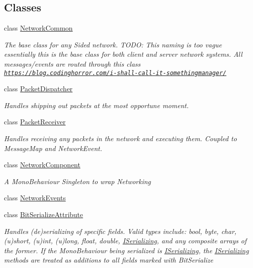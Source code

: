 \subsection*{Classes}
\begin{DoxyCompactItemize}
\item 
class \hyperlink{class_skyrates_1_1_common_1_1_network_1_1_network_common}{Network\-Common}
\begin{DoxyCompactList}\small\item\em The base class for any Sided network. T\-O\-D\-O\-: This naming is too vague essentially this is the base class for both client and server network systems. All messages/events are routed through this class \href{https://blog.codinghorror.com/i-shall-call-it-somethingmanager/}{\tt https\-://blog.\-codinghorror.\-com/i-\/shall-\/call-\/it-\/somethingmanager/} \end{DoxyCompactList}\item 
class \hyperlink{class_skyrates_1_1_common_1_1_network_1_1_packet_dispatcher}{Packet\-Dispatcher}
\begin{DoxyCompactList}\small\item\em Handles shipping out packets at the most opportune moment. \end{DoxyCompactList}\item 
class \hyperlink{class_skyrates_1_1_common_1_1_network_1_1_packet_receiver}{Packet\-Receiver}
\begin{DoxyCompactList}\small\item\em Handles receiving any packets in the network and executing them. Coupled to Message\-Map and Network\-Event. \end{DoxyCompactList}\item 
class \hyperlink{class_skyrates_1_1_common_1_1_network_1_1_network_component}{Network\-Component}
\begin{DoxyCompactList}\small\item\em A Mono\-Behaviour Singleton to wrap Networking \end{DoxyCompactList}\item 
class \hyperlink{class_skyrates_1_1_common_1_1_network_1_1_network_events}{Network\-Events}
\item 
class \hyperlink{class_skyrates_1_1_common_1_1_network_1_1_bit_serialize_attribute}{Bit\-Serialize\-Attribute}
\begin{DoxyCompactList}\small\item\em Handles (de)serializing of specific fields. Valid types include\-: bool, byte, char, (u)short, (u)int, (u)long, float, double, \hyperlink{interface_skyrates_1_1_common_1_1_network_1_1_i_serializing}{I\-Serializing}, and any composite arrays of the former. If the Mono\-Behaviour being serialized is \hyperlink{interface_skyrates_1_1_common_1_1_network_1_1_i_serializing}{I\-Serializing}, the \hyperlink{interface_skyrates_1_1_common_1_1_network_1_1_i_serializing}{I\-Serializing} methods are treated as additions to all fields marked with Bit\-Serialize \end{DoxyCompactList}\item 

\end{DoxyCompactItemize}
